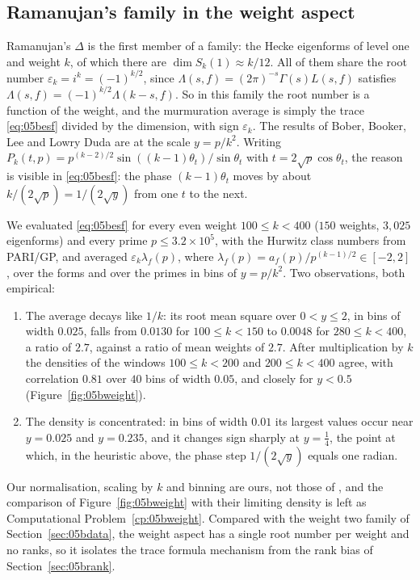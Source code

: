 \subsection{Ramanujan's family in the weight aspect}

Ramanujan's $\Delta$ is the first member of a family: the Hecke eigenforms of level one and weight $k$, of which there are $\dim S_k(1)\approx k/12$. All of them share the root number $\varepsilon_k=i^k=(-1)^{k/2}$, since $\Lambda(s,f)=(2\pi)^{-s}\Gamma(s)L(s,f)$ satisfies $\Lambda(s,f)=(-1)^{k/2}\Lambda(k-s,f)$. So in this family the root number is a function of the weight, and the murmuration average is simply the trace \eqref{eq:05besf} divided by the dimension, with sign $\varepsilon_k$. The results of Bober, Booker, Lee and Lowry Duda \cite{bbllp2023} are at the scale $y=p/k^2$. Writing $P_k(t,p)=p^{(k-2)/2}\sin((k-1)\theta_t)/\sin\theta_t$ with $t=2\sqrt p\cos\theta_t$, the reason is visible in \eqref{eq:05besf}: the phase $(k-1)\theta_t$ moves by about $k/(2\sqrt p)=1/(2\sqrt y)$ from one $t$ to the next.

We evaluated \eqref{eq:05besf} for every even weight $100\le k<400$ ($150$ weights, $3{,}025$ eigenforms) and every prime $p\le3.2\times10^5$, with the Hurwitz class numbers from PARI/GP, and averaged $\varepsilon_k\lambda_f(p)$, where $\lambda_f(p)=a_f(p)/p^{(k-1)/2}\in[-2,2]$, over the forms and over the primes in bins of $y=p/k^2$. Two observations, both empirical:

\begin{enumerate}
\item The average decays like $1/k$: its root mean square over $0<y\le2$, in bins of width $0.025$, falls from $0.0130$ for $100\le k<150$ to $0.0048$ for $280\le k<400$, a ratio of $2.7$, against a ratio of mean weights of $2.7$. After multiplication by $k$ the densities of the windows $100\le k<200$ and $200\le k<400$ agree, with correlation $0.81$ over $40$ bins of width $0.05$, and closely for $y<0.5$ (Figure~\ref{fig:05bweight}).
\item The density is concentrated: in bins of width $0.01$ its largest values occur near $y=0.025$ and $y=0.235$, and it changes sign sharply at $y=\frac14$, the point at which, in the heuristic above, the phase step $1/(2\sqrt y)$ equals one radian.
\end{enumerate}

Our normalisation, scaling by $k$ and binning are ours, not those of \cite{bbllp2023}, and the comparison of Figure~\ref{fig:05bweight} with their limiting density is left as Computational Problem~\ref{cp:05bweight}. Compared with the weight two family of Section~\ref{sec:05bdata}, the weight aspect has a single root number per weight and no ranks, so it isolates the trace formula mechanism from the rank bias of Section~\ref{sec:05brank}.

